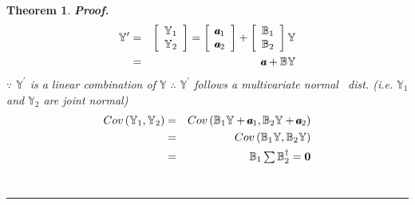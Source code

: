 \documentclass{article}
\newtheorem{theorem}{Theorem}
\newenvironment{proof}[1][Proof]{\noindent\textbf{#1.} }{\ \rule{0.5em}{0.5em}}
\begin{document}
\begin{theorem}
\begin{proof}
\begin{eqnarray*}
\mathbb{Y}^{\prime } &=&\left[ 
\begin{array}{c}
\mathbb{Y}_{1} \\ 
\mathbb{Y}_{2}%
\end{array}%
\right] =\left[ 
\begin{array}{c}
a\mkern-11mu a%
_{1} \\ 
a\mkern-11mu a%
_{2}%
\end{array}%
\right] +\left[ 
\begin{array}{c}
\mathbb{B}_{1} \\ 
\mathbb{B}_{2}%
\end{array}%
\right] \mathbb{Y} \\
&=&%
a\mkern-11mu a%
+\mathbb{BY}
\end{eqnarray*}%
\newline
$\because $ $\mathbb{Y}^{\prime }$ is a linear combination of $\mathbb{Y}$%
\newline
$\therefore $ $\mathbb{Y}^{\prime }$ follows a multivariate normal \ dist.%
\newline
(i.e. $\mathbb{Y}_{1}$ and $\mathbb{Y}_{2}$ are joint normal)%
\begin{eqnarray*}
Cov\left( \mathbb{Y}_{1},\mathbb{Y}_{2}\right) &=&Cov\left( \mathbb{B}_{1}%
\mathbb{Y}+%
a\mkern-11mu a%
_{1},\mathbb{B}_{2}\mathbb{Y}+%
a\mkern-11mu a%
_{2}\right) \\
&=&Cov\left( \mathbb{B}_{1}\mathbb{Y},\mathbb{B}_{2}\mathbb{Y}\right) \\
&=&\mathbb{B}_{1}\tsum \mathbb{B}_{2}^{\dagger }=\boldsymbol{0}
\end{eqnarray*}
\end{proof}
\end{theorem}
\end{document}
